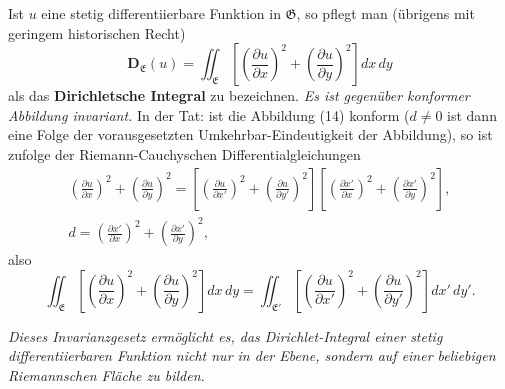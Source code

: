 \documentclass{article}
\begin{document}
Ist $u$ eine stetig differentiierbare Funktion in $\mathfrak{G}$, so pflegt man (übrigens mit geringem historischen Recht)
\[ \mathbf{D}_{\mathfrak{E}}(u) = \iint_{\mathfrak{E}} \left[ \left(\frac{\partial u}{\partial x}\right)^2 + \left(\frac{\partial u}{\partial y}\right)^2 \right] dx\,dy \]
als das \textbf{Dirichletsche Integral} zu bezeichnen. \emph{Es ist gegenüber konformer Abbildung invariant.} In der Tat: ist die Abbildung (14) konform ($d \neq 0$ ist dann eine Folge der vorausgesetzten Umkehrbar-Eindeutigkeit der Abbildung), so ist zufolge der Riemann-Cauchyschen Differentialgleichungen
\[ \begin{gathered}
\left(\frac{\partial u}{\partial x}\right)^2 + \left(\frac{\partial u}{\partial y}\right)^2 = \left[ \left(\frac{\partial u}{\partial x'}\right)^2 + \left(\frac{\partial u}{\partial y'}\right)^2 \right] \left[ \left(\frac{\partial x'}{\partial x}\right)^2 + \left(\frac{\partial x'}{\partial y}\right)^2 \right], \\
d = \left(\frac{\partial x'}{\partial x}\right)^2 + \left(\frac{\partial x'}{\partial y}\right)^2,
\end{gathered} \]
also
\[ \iint_{\mathfrak{E}} \left[ \left(\frac{\partial u}{\partial x}\right)^2 + \left(\frac{\partial u}{\partial y}\right)^2 \right] dx\,dy = \iint_{\mathfrak{E}'} \left[ \left(\frac{\partial u}{\partial x'}\right)^2 + \left(\frac{\partial u}{\partial y'}\right)^2 \right] dx'\,dy'. \]

\emph{Dieses Invarianzgesetz ermöglicht es, das Dirichlet-Integral einer stetig differentiierbaren Funktion nicht nur in der Ebene, sondern auf einer beliebigen Riemannschen Fläche zu bilden.}
\end{document}
